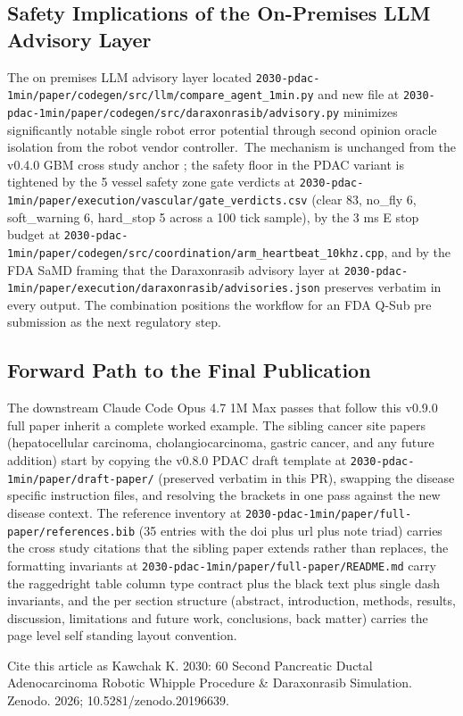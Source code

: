 \subsection{Safety Implications of the On-Premises LLM Advisory Layer}
\label{sec:conclusions-safety}

The on premises LLM advisory layer located
\texttt{2030-pdac-1min/paper/codegen/src/llm/compare_agent_1min.py}
and new file at
\texttt{2030-pdac-1min/paper/codegen/src/daraxonrasib/advisory.py}
minimizes significantly notable single robot error potential through second opinion
oracle isolation from the robot vendor controller.\ The mechanism
is unchanged from the v0.4.0 GBM cross study anchor
\cite{kawchak_2026_20113157}; the safety floor in the PDAC
variant is tightened by the 5 vessel safety zone gate verdicts at
\texttt{2030-pdac-1min/paper/execution/vascular/gate_verdicts.csv}
(clear 83, no_fly 6, soft_warning 6, hard_stop 5 across a 100
tick sample), by the 3 ms E stop budget at
\texttt{2030-pdac-1min/paper/codegen/src/coordination/arm_heartbeat_10khz.cpp},
and by the FDA SaMD framing \cite{fda-samd} that the Daraxonrasib
advisory layer at
\texttt{2030-pdac-1min/paper/execution/daraxonrasib/advisories.json}
preserves verbatim in every output. The combination positions the
workflow for an FDA Q-Sub pre submission as the next regulatory
step.

\subsection{Forward Path to the Final Publication}
\label{sec:conclusions-forward}

The downstream Claude Code Opus 4.7 1M Max passes that follow
this v0.9.0 full paper inherit a complete worked example. The
sibling cancer site papers (hepatocellular carcinoma,
cholangiocarcinoma, gastric cancer, and any future addition)
start by copying the v0.8.0 PDAC draft template at
\texttt{2030-pdac-1min/paper/draft-paper/} (preserved verbatim in
this PR), swapping the disease specific instruction files, and
resolving the brackets in one pass against the new disease
context. The reference inventory at
\texttt{2030-pdac-1min/paper/full-paper/references.bib} (35
entries with the doi plus url plus note triad) carries the cross
study citations that the sibling paper extends rather than
replaces, the formatting invariants at
\texttt{2030-pdac-1min/paper/full-paper/README.md} carry the
raggedright table column type contract plus the black text plus
single dash invariants, and the per section structure (abstract,
introduction, methods, results, discussion, limitations and
future work, conclusions, back matter) carries the page level
self standing layout convention.

Cite this article as Kawchak K. 2030: 60 Second Pancreatic Ductal Adenocarcinoma Robotic Whipple Procedure \&
Daraxonrasib Simulation. Zenodo. 2026; 10.5281/zenodo.20196639.
